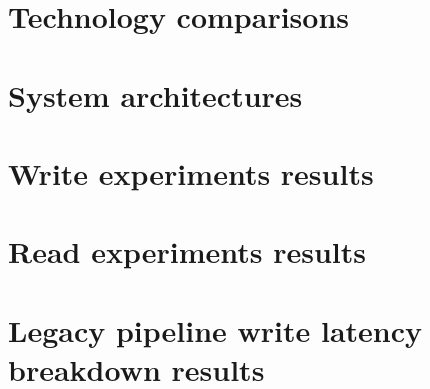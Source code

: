 \chapter{Technology comparisons}
    \label{appx:tech_comp}
    

\chapter{System architectures}
    \label{appx:sys_arch}
    

\chapter{Write experiments results}
    \label{appx:res_write}
    

\chapter{Read experiments results}
    \label{appx:res_read}
    

\chapter{Legacy pipeline write latency breakdown results}
    \label{appx:res_hudi}
    